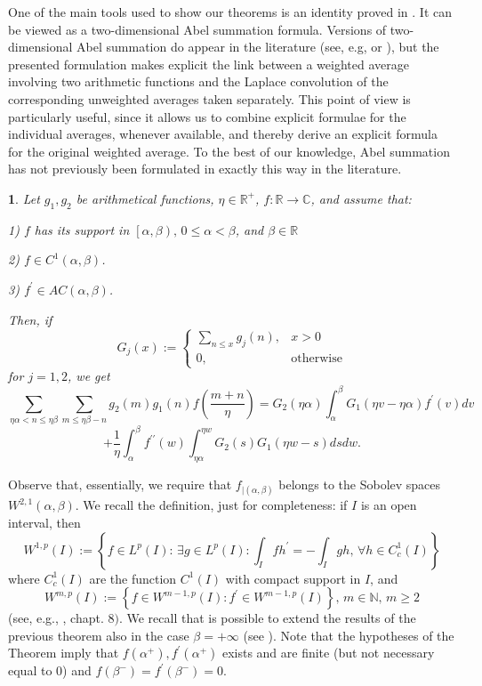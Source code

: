 \documentclass[10pt,a4paper]{amsart}
\numberwithin{equation}{section}
\numberwithin{figure}{section}
\newtheorem{thm}{\protect\theoremname}
\providecommand{\theoremname}{Theorem}
\begin{document}
One of the main tools used to show our theorems is an identity proved
in \cite{CGZ2025}. It can be viewed as a two-dimensional Abel summation
formula. Versions of two-dimensional Abel summation do appear in the
literature (see, e.g, \cite{KT2006} or \cite{BP2018}), but the presented
formulation makes explicit the link between a weighted average involving
two arithmetic functions and the Laplace convolution of the corresponding
unweighted averages taken separately. This point of view is particularly
useful, since it allows us to combine explicit formulae for the individual
averages, whenever available, and thereby derive an explicit formula
for the original weighted average. To the best of our knowledge, Abel
summation has not previously been formulated in exactly this way in
the literature.
\begin{thm}
\label{thm:MAINCGZ}Let $g_{1},g_{2}$ be arithmetical functions,
$\eta\in\mathbb{R}^{+}$, $f:\mathbb{R}\rightarrow\mathbb{C}$, and
assume that:

1) $f$ has its support in $\left[\alpha,\beta\right),\,0\leq\alpha<\beta$,
and $\beta\in\mathbb{R}$

2) $f\in C^{1}\left(\alpha,\beta\right)$.

3) $f^{\prime}\in AC\left(\alpha,\beta\right)$.

Then, if 
\[
G_{j}\left(x\right):=\begin{cases}
\sum_{n\leq x}g_{j}\left(n\right), & x>0\\
0, & \text{otherwise}
\end{cases}
\]
for $j=1,2$, we get
\[
\sum_{\eta\alpha<n\leq\eta\beta}\sum_{m\leq\eta\beta-n}g_{2}\left(m\right)g_{1}\left(n\right)f\left(\frac{m+n}{\eta}\right)=G_{2}\left(\eta\alpha\right)\int_{\alpha}^{\beta}G_{1}\left(\eta v-\eta\alpha\right)f^{\prime}\left(v\right)dv
\]
\[
+\frac{1}{\eta}\int_{\alpha}^{\beta}f^{\prime\prime}\left(w\right)\int_{\eta\alpha}^{\eta w}G_{2}\left(s\right)G_{1}\left(\eta w-s\right)dsdw.
\]
\end{thm}

Observe that, essentially, we require that $f_{\vert\left(\alpha,\beta\right)}$
belongs to the Sobolev spaces $W^{2,1}\left(\alpha,\beta\right)$.
We recall the definition, just for completeness: if $I$ is an open
interval, then
\[
W^{1,p}\left(I\right):=\left\{ f\in L^{p}\left(I\right):\,\exists g\in L^{p}\left(I\right):\int_{I}fh^{\prime}=-\int_{I}gh,\,\forall h\in C_{c}^{1}\left(I\right)\right\} 
\]
where $C_{c}^{1}\left(I\right)$ are the function $C^{1}\left(I\right)$
with compact support in $I$, and
\[
W^{m,p}\left(I\right):=\left\{ f\in W^{m-1,p}\left(I\right):f^{\prime}\in W^{m-1,p}\left(I\right)\right\} ,\,m\in\mathbb{N},\,m\ge2
\]
(see, e.g., \cite{B2011}, chapt. $8)$. We recall that is possible
to extend the results of the previous theorem also in the case $\beta=+\infty$
(see \cite{CGZ2025}). Note that the hypotheses of the Theorem imply
that $f\left(\alpha^{+}\right),f^{\prime}\left(\alpha^{+}\right)$
exists and are finite (but not necessary equal to $0$) and $f\left(\beta^{-}\right)=f^{\prime}\left(\beta^{-}\right)=0$. 
\end{document}
